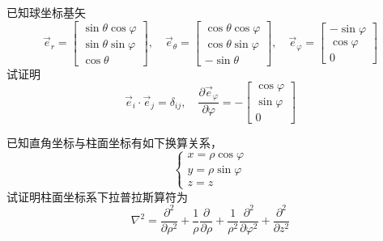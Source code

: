 ~~\\ 
~~\\
\begin{Exercises} 
\item 已知球坐标基矢 $$\vec{e}_r = \left[\begin{array}{ccc}
		\sin \theta \cos \varphi \\
		\sin \theta \sin \varphi \\
		\cos \theta
	\end{array}\right], \quad  
	\vec{e}_\theta = \left[\begin{array}{ccc}
		\cos \theta \cos \varphi \\
		\cos \theta \sin \varphi \\
		-\sin \theta
	\end{array}\right], \quad  
	\vec{e}_\varphi = \left[\begin{array}{ccc}
		-\sin \varphi \\
		\cos \varphi \\
		0
	\end{array}\right]
	$$ 
	试证明 
	\begin{equation*}
		\vec{e}_{i} \cdot \vec{e}_{j} = \delta_{ij}, \quad \dfrac{\partial \vec{e}_{\varphi}}{\partial \varphi} =  -\left[\begin{array}{c} \cos \varphi \\ \sin \varphi \\ 0\end{array}\right]
	\end{equation*} 
	\item 已知直角坐标与柱面坐标有如下换算关系，
	$$\begin{cases}
		x= \rho\cos \varphi  \\
		y= \rho\sin \varphi  \\
		z= z
	\end{cases} $$ 
	试证明柱面坐标系下拉普拉斯算符为 
	$$\nabla^2=\frac{\partial^2}{\partial \rho^2}+\frac{1}{\rho} \frac{\partial}{\partial \rho}+\frac{1}{\rho^2} \frac{\partial^2}{\partial \varphi^2}+\frac{\partial^2}{\partial z^2}$$


\end{Exercises}
